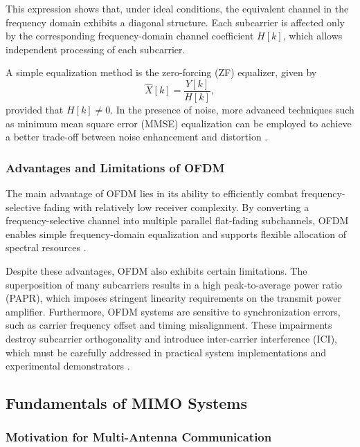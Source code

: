 This expression shows that, under ideal conditions, the equivalent channel in the frequency domain exhibits a diagonal structure. Each subcarrier is affected only by the corresponding frequency-domain channel coefficient $H[k]$, which allows independent processing of each subcarrier.

A simple equalization method is the zero-forcing (ZF) equalizer, given by
\begin{equation}
\hat{X}[k] = \frac{Y[k]}{H[k]},
\end{equation}
provided that $H[k] \neq 0$. In the presence of noise, more advanced techniques such as minimum mean square error (MMSE) equalization can be employed to achieve a better trade-off between noise enhancement and distortion \cite{proakis2008digital}.

\subsubsection{Advantages and Limitations of OFDM}

The main advantage of OFDM lies in its ability to efficiently combat frequency-selective fading with relatively low receiver complexity. By converting a frequency-selective channel into multiple parallel flat-fading subchannels, OFDM enables simple frequency-domain equalization and supports flexible allocation of spectral resources \cite{nee2000ofdm}.

Despite these advantages, OFDM also exhibits certain limitations. The superposition of many subcarriers results in a high peak-to-average power ratio (PAPR), which imposes stringent linearity requirements on the transmit power amplifier. Furthermore, OFDM systems are sensitive to synchronization errors, such as carrier frequency offset and timing misalignment. These impairments destroy subcarrier orthogonality and introduce inter-carrier interference (ICI), which must be carefully addressed in practical system implementations and experimental demonstrators \cite{haring_ofdm_lecture}.

\subsection{Fundamentals of MIMO Systems}

\subsubsection{Motivation for Multi-Antenna Communication}

